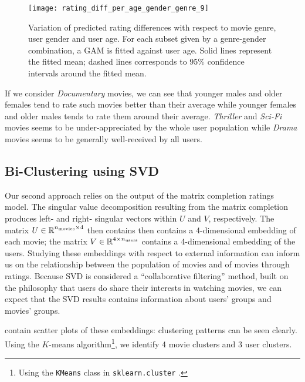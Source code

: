 \documentclass[bj, preprint]{imsart}
\begin{document}
\begin{figure}[t!]
    \centering
	\texttt{[image: rating\_diff\_per\_age\_gender\_genre\_9]}
	\caption{Variation of predicted rating differences with respect to movie genre, user gender and user age. For each subset given by a genre-gender combination, a GAM is fitted against user age. Solid lines represent the fitted mean; dashed lines corresponds to 95\% confidence intervals around the fitted mean.\label{fig:explore.corr.gam}}
\end{figure}

If we consider \textit{Documentary} movies, we can see that younger males and older females tend to rate such movies better than their average while younger females and older males tends to rate them around their average. \textit{Thriller} and \textit{Sci-Fi} movies seems to be under-appreciated by the whole user population while \textit{Drama} movies seems to be generally well-received by all users.

\subsection{Bi-Clustering using SVD}\label{subsec:explore.cluster}

Our second approach relies on the output of the matrix completion ratings model. The singular value decomposition resulting from the matrix completion produces left- and right- singular vectors within $U$ and $V$, respectively. The matrix $U\in\operatorname{\mathbb R}^{n_{\text{movies}}\times 4}$ then contains then contains a 4-dimensional embedding of each movie; the matrix $V\in\operatorname{\mathbb R}^{4\times n_{\text{users}}}$ contains a 4-dimensional embedding of the users. Studying these embeddings with respect to external information can inform us on the relationship between the population of movies and of movies through ratings. Because SVD is considered a ``collaborative filtering'' method, built on the philosophy that users do share their interests in watching movies, we can expect that the SVD results contains information about users' groups and movies' groups.

 contain scatter plots of these embeddings: clustering patterns can be seen clearly. Using the $K$-means algorithm\footnote{Using the \texttt{KMeans} class in \texttt{sklearn.cluster} \citep{scikit-learn}.}, we identify 4 movie clusters and 3 user clusters.
\end{document}
